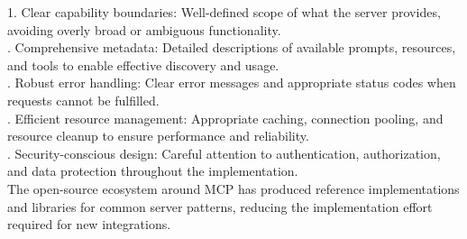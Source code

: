 1. Clear capability boundaries: Well-defined scope of what the server provides, avoiding overly broad or ambiguous functionality.\\ . Comprehensive metadata: Detailed descriptions of available prompts, resources, and tools to enable effective discovery and usage.\\ . Robust error handling: Clear error messages and appropriate status codes when requests cannot be fulfilled.\\ . Efficient resource management: Appropriate caching, connection pooling, and resource cleanup to ensure performance and reliability.\\ . Security-conscious design: Careful attention to authentication, authorization, and data protection throughout the implementation.\\ \newline
The open-source ecosystem around MCP has produced reference implementations and libraries for common server patterns, reducing the implementation effort required for new integrations.\\
